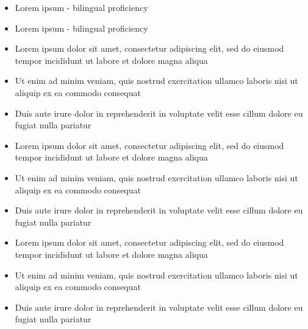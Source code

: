 \documentclass{resume_template}
\begin{document}
\begin{tcbraster}[grid]
\begin{tcolorbox}[sidebar,raster multicolumn=2]
				\vspace*{-0.33in}
				\begin{itemize}
					\item[] Lorem ipsum - bilingual proficiency
					\item[] Lorem ipsum - bilingual proficiency
				\end{itemize}
		\end{tcolorbox}
		\begin{tcolorbox}[main,raster multicolumn=4]
				\begin{itemize}
					\item Lorem ipsum dolor sit amet, consectetur adipiscing elit, sed do eiusmod tempor incididunt ut labore et dolore magna aliqua
					\item Ut enim ad minim veniam, quis nostrud exercitation ullamco laboris nisi ut aliquip ex ea commodo consequat
					\item Duis aute irure dolor in reprehenderit in voluptate velit esse cillum dolore eu fugiat nulla pariatur
				\end{itemize}
				\begin{itemize}
					\item Lorem ipsum dolor sit amet, consectetur adipiscing elit, sed do eiusmod tempor incididunt ut labore et dolore magna aliqua
					\item Ut enim ad minim veniam, quis nostrud exercitation ullamco laboris nisi ut aliquip ex ea commodo consequat
					\item Duis aute irure dolor in reprehenderit in voluptate velit esse cillum dolore eu fugiat nulla pariatur
				\end{itemize}
						
				\begin{itemize}
					\item Lorem ipsum dolor sit amet, consectetur adipiscing elit, sed do eiusmod tempor incididunt ut labore et dolore magna aliqua
					\item Ut enim ad minim veniam, quis nostrud exercitation ullamco laboris nisi ut aliquip ex ea commodo consequat
					\item Duis aute irure dolor in reprehenderit in voluptate velit esse cillum dolore eu fugiat nulla pariatur
				\end{itemize}			
		\end{tcolorbox}
	\end{tcbraster}
\end{document}
